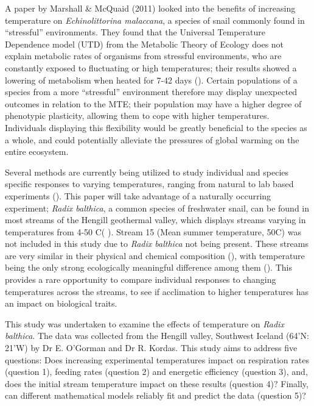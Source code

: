 \documentclass[../../Paper.tex]{subfiles}
\begin{document}
A paper by Marshall \& McQuaid (2011) looked into the 
benefits of increasing temperature on \textit{Echinolittorina malaccana}, a species of snail 
commonly found in ``stressful'' environments. They found that the Universal Temperature 
Dependence model (UTD) from the Metabolic Theory of Ecology does not explain metabolic rates 
of organisms from stressful environments, who are constantly exposed to fluctuating or high 
temperatures; their results showed a lowering of metabolism when heated for 7-42 days 
(\cite{marshall_warming_2011}). Certain populations of a species from a more ``stressful'' 
environment therefore may display unexpected outcomes in relation to the MTE; their 
population may have a higher degree of phenotypic plasticity, allowing them to cope with 
higher temperatures. Individuals  displaying this flexibility would be 
greatly beneficial to the species as a whole, and could potentially alleviate the 
pressures of global warming on the entire ecosystem. 

Several methods are currently being utilized to study individual and species specific responses
to varying temperatures, ranging from natural to lab based experiments (\cite{schulte_thermal_2011,brusch_turn_2016}).
This paper will take advantage of a naturally occurring experiment; \textit{Radix balthica}, a common
species of freshwater snail, can be found in most streams of the Hengill geothermal valley, which
displays streams varying in temperatures from 4-50 \degree C(
\cite{friberg_relationships_2009,ogorman_chapter_2012}). Stream 15 (Mean summer temperature, 50\degree C) was not included in this study
due to \textit{Radix balthica} not being present. These streams are very similar in their physical and chemical 
composition (\cite{ogorman_chapter_2012}), with temperature being the only strong 
ecologically meaningful difference among them (\cite{friberg_relationships_2009}). This provides a rare opportunity
to compare individual responses to changing temperatures across the streams, to see if 
acclimation to higher temperatures has an impact on biological traits. 

This study was undertaken to examine the effects of temperature on \textit{Radix balthica}. The data
was collected from the Hengill valley, Southwest Iceland (64'N: 21'W) by Dr E. 
O'Gorman and Dr R. Kordas. This study aims to address five questions: Does increasing experimental 
temperatures impact on respiration rates (question 1), feeding rates (question 2) and energetic 
efficiency (question 3), and, does the initial stream temperature impact on these results (question 4)?
Finally, can different mathematical models reliably fit and predict the data (question 5)?  
\end{document}
